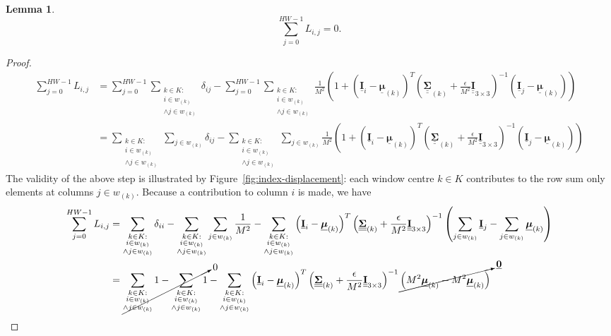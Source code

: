 \documentclass{article}
\theoremstyle{definition}
\newtheorem{lemma}[theorem]{Lemma}
\def\vt#1{\underline{\mathbf{#1}}}
\def\vts#1{\underline{\boldsymbol{#1}}}
\def\mt#1{\underline{\underline{\mathbf{#1}}}}
\def\mts#1{\underline{\underline{\boldsymbol{#1}}}}
\begin{document}
\begin{lemma}\label{lemma3}
    $$\sum_{j=0}^{HW-1} L_{i,j} = 0.$$
    \begin{proof}
        \begin{align*}
            \sum_{j=0}^{HW-1} L_{i,j} &= \sum_{j=0}^{HW-1} \sum_{\substack{k\in K:\\i\in w_{(k)}\\ \wedge j\in w_{(k)}}} \delta_{ij} - \sum_{j=0}^{HW-1} \sum_{\substack{k\in K:\\i\in w_{(k)}\\ \wedge j\in w_{(k)}}} \frac1{M^2} \left(1 + \left(\vt{I}_i - \vts \mu_{(k)}\right)^T \left(\mts \Sigma_{(k)} + \frac\epsilon{M^2} \mt{I}_{3\times 3}\right)^{-1} \left(\vt{I}_j - \vts
            \mu_{(k)}\right) \right)\\
            &= \sum_{\substack{k\in K:\\i\in w_{(k)}\\ \wedge j\in w_{(k)}}} \sum_{j\in w_{(k)}} \delta_{ij} - \sum_{\substack{k\in K:\\i\in w_{(k)}\\ \wedge j\in w_{(k)}}} \sum_{j\in w_{(k)}} \frac1{M^2} \left(1 + \left(\vt{I}_i - \vts \mu_{(k)}\right)^T \left(\mts \Sigma_{(k)} + \frac\epsilon{M^2} \mt{I}_{3\times 3}\right)^{-1} \left(\vt{I}_j - \vts
            \mu_{(k)}\right) \right)
        \end{align*}
        The validity of the above step is illustrated by Figure~\ref{fig:index-displacement}: each window centre $k\in K$ contributes to the row sum only elements at columns $j\in w_{(k)}$. Because a contribution to column $i$ is made, we have
        \begin{align*}
            \sum_{j=0}^{HW-1} L_{i,j} &= \sum_{\substack{k\in K:\\i\in w_{(k)}\\ \wedge j\in w_{(k)}}} \delta_{ii} - \sum_{\substack{k\in K:\\i\in w_{(k)}\\ \wedge j\in w_{(k)}}} \sum_{j\in w_{(k)}} \frac1{M^2}  - \sum_{\substack{k\in K:\\i\in w_{(k)}\\ \wedge j\in w_{(k)}}} \left(\vt{I}_i - \vts \mu_{(k)}\right)^T \left(\mts \Sigma_{(k)} + \frac\epsilon{M^2} \mt{I}_{3\times 3}\right)^{-1}  \left(\sum_{j\in w_{(k)}} \vt{I}_j - \sum_{j\in w_{(k)}} \vts \mu_{(k)}\right)  \\
            &= \cancelto0{\sum_{\substack{k\in K:\\i\in w_{(k)}\\ \wedge j\in w_{(k)}}} 1 - \sum_{\substack{k\in K:\\i\in w_{(k)}\\ \wedge j\in w_{(k)}}} 1}  - \sum_{\substack{k\in K:\\i\in w_{(k)}\\ \wedge j\in w_{(k)}}} \left(\vt{I}_i - \vts \mu_{(k)}\right)^T \left(\mts \Sigma_{(k)} + \frac\epsilon{M^2} \mt{I}_{3\times 3}\right)^{-1}  \cancelto{\vt 0}{\left(M^2 \vts \mu_{(k)} - M^2 \vts \mu_{(k)}\right)}  \\

\end{align*}
\end{proof}
\end{lemma}
\end{document}
